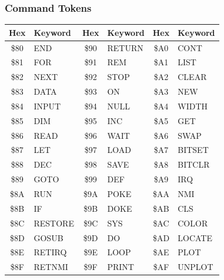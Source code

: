 \subsubsection*{Command Tokens}

\begin{center}
\begin{longtable}{cl|cl|cl}
\toprule
\textbf{Hex} & \textbf{Keyword} &
\textbf{Hex} & \textbf{Keyword} &
\textbf{Hex} & \textbf{Keyword} \\
\midrule
\endhead
\$80 & END      & \$90 & RETURN   & \$A0 & CONT     \\
\$81 & FOR      & \$91 & REM      & \$A1 & LIST     \\
\$82 & NEXT     & \$92 & STOP     & \$A2 & CLEAR    \\
\$83 & DATA     & \$93 & ON       & \$A3 & NEW      \\
\$84 & INPUT    & \$94 & NULL     & \$A4 & WIDTH    \\
\$85 & DIM      & \$95 & INC      & \$A5 & GET      \\
\$86 & READ     & \$96 & WAIT     & \$A6 & SWAP     \\
\$87 & LET      & \$97 & LOAD     & \$A7 & BITSET   \\
\$88 & DEC      & \$98 & SAVE     & \$A8 & BITCLR   \\
\$89 & GOTO     & \$99 & DEF      & \$A9 & IRQ      \\
\$8A & RUN      & \$9A & POKE     & \$AA & NMI      \\
\$8B & IF       & \$9B & DOKE     & \$AB & CLS      \\
\$8C & RESTORE  & \$9C & SYS      & \$AC & COLOR    \\
\$8D & GOSUB    & \$9D & DO       & \$AD & LOCATE   \\
\$8E & RETIRQ   & \$9E & LOOP     & \$AE & PLOT     \\
\$8F & RETNMI   & \$9F & PRINT    & \$AF & UNPLOT   \\
\bottomrule
\end{longtable}
\end{center}

